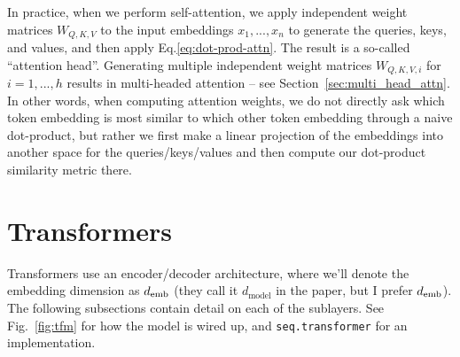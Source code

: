 \documentclass[11pt]{article}
\numberwithin{equation}{section}
\begin{document}
In practice, when we perform self-attention, we apply independent weight matrices $W_{Q,K,V}$ to the input embeddings $x_1,...,x_n$ to generate the queries, keys, and values, and then apply Eq.\eqref{eq:dot-prod-attn}. The result is a so-called ``attention head''. Generating multiple independent weight matrices $W_{Q,K,V,i}$ for $i=1,...,h$ results in multi-headed attention -- see Section~\ref{sec:multi_head_attn}. In other words, when computing attention weights, we do not directly ask which token embedding is most similar to which other token embedding through a naive dot-product, but rather we first make a linear projection of the embeddings into another space for the queries/keys/values and then compute our dot-product similarity metric there.




\section{Transformers}

Transformers \citep{Vaswani17} use an encoder/decoder architecture, where we'll denote the embedding dimension as $d_{\text{emb}}$ (they call it $d_{\text{model}}$ in the paper, but I prefer $d_{\text{emb}}$). The following subsections contain detail on each of the sublayers. See Fig.~\ref{fig:tfm} for how the model is wired up, and \verb+seq.transformer+ for an implementation.
\end{document}
